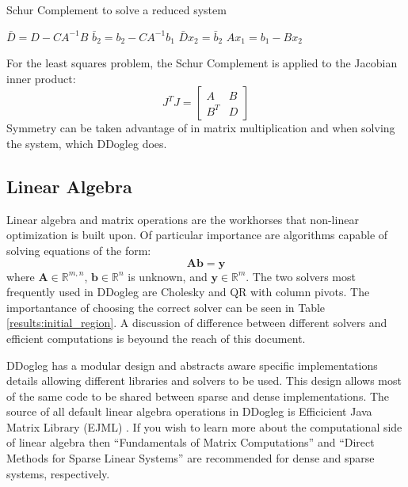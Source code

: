 \documentclass[peerreview,compsoc,onecolumn]{IEEEtran}
\newcommand{\R}{\mathbb{R}}
\begin{document}
\begin{algorithm}{}
\caption{\label{alg:schur_complement}Schur Complement to solve a reduced system}
\begin{algorithmic}[1]
	\State $\bar{D} = D - C A^{-1} B$
	\State $\bar{b}_2 = b_2 - C A^{-1} b_1$  
	\State $\bar{D} x_2 = \bar{b}_2$         
	\State $A x_1 = b_1 - B x_2$
\end{algorithmic}
\end{algorithm}

For the least squares problem, the Schur Complement is applied to the Jacobian inner product:
\begin{equation}
J^T J =
\begin{bmatrix}
A & B \\
B^T & D
\end{bmatrix}
\end{equation}
Symmetry can be taken advantage of in matrix multiplication and when solving the system, which DDogleg does.

\subsection{Linear Algebra}

Linear algebra and matrix operations are the workhorses that non-linear optimization is built upon. Of particular importance are algorithms capable of solving equations of the form:
\begin{equation}
\bm{A}\bm{b} = \bm{y}
\end{equation}
where $\bm{A} \in \R^{m,n}$, $\bm{b} \in \R^n$ is unknown, and $\bm{y} \in \R^m$. The two solvers most frequently used in DDogleg are Cholesky and QR with column pivots. The importantance of choosing the correct solver can be seen in Table \ref{results:initial_region}. A discussion of difference between different solvers and efficient computations is beyound the reach of this document.

DDogleg has a modular design and abstracts aware specific implementations details allowing different libraries and solvers to be used. This design allows most of the same code to be shared between sparse and dense implementations. The source of all default linear algebra operations in DDogleg is Efficicient Java Matrix Library (EJML) \cite{ejml2018}. If you wish to learn more about the computational side of linear algebra then ``Fundamentals of Matrix Computations'' \cite{watkins2010} and ``Direct Methods for Sparse Linear Systems'' \cite{davis2006} are recommended for dense and sparse systems, respectively.
\end{document}
